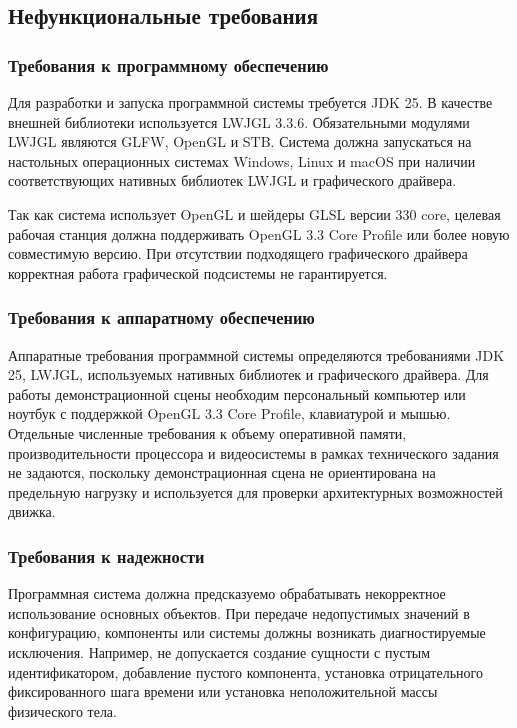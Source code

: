 \subsection{Нефункциональные требования}

\subsubsection{Требования к программному обеспечению}

Для разработки и запуска программной системы требуется JDK 25. В качестве внешней библиотеки используется LWJGL 3.3.6. Обязательными модулями LWJGL являются GLFW, OpenGL и STB. Система должна запускаться на настольных операционных системах Windows, Linux и macOS при наличии соответствующих нативных библиотек LWJGL и графического драйвера.

Так как система использует OpenGL и шейдеры GLSL версии 330 core, целевая рабочая станция должна поддерживать OpenGL 3.3 Core Profile или более новую совместимую версию. При отсутствии подходящего графического драйвера корректная работа графической подсистемы не гарантируется.

\subsubsection{Требования к аппаратному обеспечению}

Аппаратные требования программной системы определяются требованиями JDK 25, LWJGL, используемых нативных библиотек и графического драйвера. Для работы демонстрационной сцены необходим персональный компьютер или ноутбук с поддержкой OpenGL 3.3 Core Profile, клавиатурой и мышью. Отдельные численные требования к объему оперативной памяти, производительности процессора и видеосистемы в рамках технического задания не задаются, поскольку демонстрационная сцена не ориентирована на предельную нагрузку и используется для проверки архитектурных возможностей движка.

\subsubsection{Требования к надежности}

Программная система должна предсказуемо обрабатывать некорректное использование основных объектов. При передаче недопустимых значений в конфигурацию, компоненты или системы должны возникать диагностируемые исключения. Например, не допускается создание сущности с пустым идентификатором, добавление пустого компонента, установка отрицательного фиксированного шага времени или установка неположительной массы физического тела.

